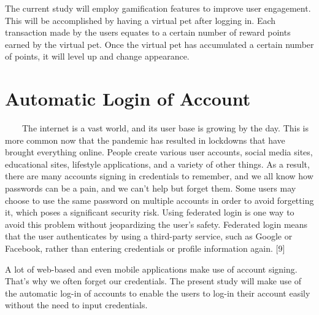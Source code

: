 The current study will employ gamification features to improve user engagement. This will be accomplished by having a virtual pet after logging in. Each transaction made by the users equates to a certain number of reward points earned by the virtual pet. Once the virtual pet has accumulated a certain number of points, it will level up and change appearance. 

\section{Automatic Login of Account}

~~~~The internet is a vast world, and its user base is growing by the day. This is more common now that the pandemic has resulted in lockdowns that have brought everything online. People create various user accounts, social media sites, educational sites, lifestyle applications, and a variety of other things. As a result, there are many accounts signing in credentials to remember, and we all know how passwords can be a pain, and we can't help but forget them. Some users may choose to use the same password on multiple accounts in order to avoid forgetting it, which poses a significant security risk. Using federated login is one way to avoid this problem without jeopardizing the user's safety. Federated login means that the user authenticates by using a third-party service, such as Google or Facebook, rather than entering credentials or profile information again. [9]

A lot of web-based and even mobile applications make use of account signing. That's why we often forget our credentials. The present study will make use of the automatic log-in of accounts to enable the users to log-in their account easily without the need to input credentials. 











